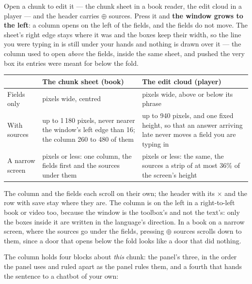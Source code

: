 \documentclass[11pt,oneside]{report}
\newcommand{\menu}[1]{\textsf{#1}}
\begin{document}
Open a chunk to edit it --- the chunk sheet in a book reader, the edit cloud in
a player --- and the header carries \menu{$\oplus$ sources}. Press it and
\textbf{the window grows to the left}: a column opens on the left of the
fields, and the fields do not move. The sheet's right edge stays where it
was and the boxes keep their width, so the line you were typing in is still
under your hands and nothing is drawn over it --- the column used to open
\emph{above} the fields, inside the same sheet, and pushed the very box its
entries were meant for below the fold.

\begin{center}
\begin{tabular}{@{}>{\raggedright\arraybackslash}p{}>{\raggedright\arraybackslash}p{}>{\raggedright\arraybackslash}p{}@{}}
\toprule
 & \textsf{The chunk sheet (book)} & \textsf{The edit cloud (player)} \\
\midrule
\textsf{Fields only} & 680 pixels wide, centred & 460 pixels wide, above or
  below its phrase \\
\addlinespace
\textsf{With sources} & up to 1\,180 pixels, never nearer the window's left
  edge than 16; the column 260 to 480 of them & up to 940 pixels, and one
  fixed height, so that an answer arriving late never moves a field you are
  typing in \\
\addlinespace
\textsf{A narrow screen} & 820 pixels or less: one column, the fields first
  and the sources under them & 720 pixels or less: the same, the sources a
  strip of at most 36\% of the screen's height \\
\bottomrule
\end{tabular}
\end{center}

\noindent The column and the fields each scroll on their own; the header
with its \menu{$\times$} and the row with \menu{save} stay where they are. The
column is on the left in a right-to-left book or video too, because the
window is the toolbox's and not the text's: only the boxes inside it are
written in the language's direction. In a book on a narrow screen, where
the sources go under the fields, pressing \menu{$\oplus$ sources} scrolls
down to them, since a door that opens below the fold looks like a door that
did nothing.

The column holds four blocks about \emph{this} chunk: the panel's three, in
the order the panel uses and ruled apart as the panel rules them, and a
fourth that hands the sentence to a chatbot of your own:
\end{document}
